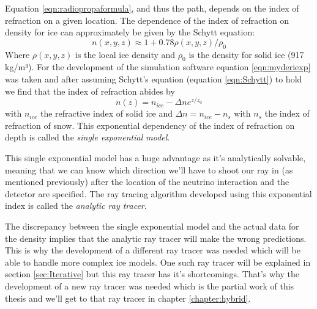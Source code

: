 Equation \ref{eqn:radiopropaformula}, and thus the path, depends on the index
of refraction on a given location.  The dependence of the index of refraction
on density for ice can approximately be given by the Schytt equation\cite{Barwick_2018}:
\begin{equation} 
	n(x,y,z) \approx 1 + 0.78\rho(x,y,z)/\rho_0 \label{eqn:Schytt}
\end{equation} 
Where $\rho(x,y,z)$ is the local ice density and $\rho_0$ is the
density for solid ice (917 kg/m³).  For the development of the simulation
software equation \ref{eqn:myderiexp} was taken and after assuming Schytt's
equation (equation \ref{eqn:Schytt}) to hold we find that the index of refraction abides by
\begin{equation}
	\label{eqn:expn}
	n(z) = n_{ice} - \Delta n e^{z/z_0}
\end{equation}
with $n_{ice}$ the refractive index of solid ice and $\Delta n = n_{ice} - n_s$
with $n_s$ the index of refraction of snow. This exponential dependency of the
index of refraction on depth is called the \textit{single exponential model}.  

This single exponential model has a huge advantage as it's analytically
solvable, meaning that we can know which direction we'll have to shoot our ray
in (as mentioned previously) after the location of the neutrino interaction and
the detector are specified. The ray tracing algorithm developed using this
exponential index is called the \textit{analytic ray tracer}.

The discrepancy between the single exponential model and the actual data for
the density implies that the analytic ray tracer will make the wrong
predictions.  This is why the development of a different ray tracer was needed
which will be able to handle more complex ice models. One such ray tracer will
be explained in section \ref{sec:Iterative} but this ray tracer has it's
shortcomings. That's why the development of a new ray tracer was needed which
is the partial work of this thesis and we'll get to that ray tracer in chapter
\ref{chapter:hybrid}.

